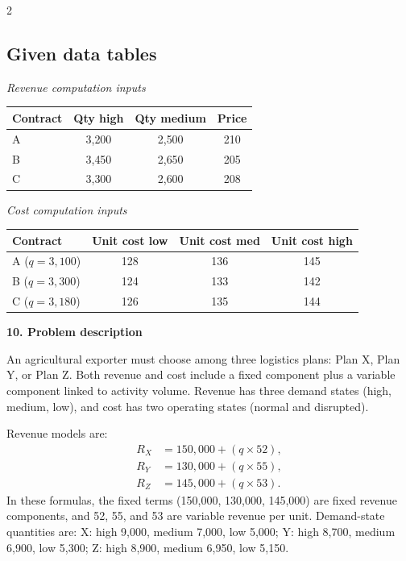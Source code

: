 \documentclass[12pt]{article}
\newcommand{\SubsectionBox}[1]{%
	\noindent\colorbox{gray!30}{%
		\parbox{\linewidth}{\textbf{#1}}%
	}\par\vspace{0.35cm}%
}
\begin{document}
\begin{multicols}{2}
				\subsection*{Given data tables}
				\begin{center}
					\begin{minipage}[t]{0.48\linewidth}
						\textit{Revenue computation inputs}
						\begin{center}
							\begin{tabular}{l c c c}
								\toprule
								Contract & Qty high & Qty medium & Price \\
								\midrule
								A & 3{,}200 & 2{,}500 & 210 \\
								B & 3{,}450 & 2{,}650 & 205 \\
								C & 3{,}300 & 2{,}600 & 208 \\
								\bottomrule
							\end{tabular}
						\end{center}
					\end{minipage}
					\hfill
					\begin{minipage}[t]{0.48\linewidth}
						\textit{Cost computation inputs}
						\begin{center}
							\begin{tabular}{l c c c}
								\toprule
								Contract & Unit cost low & Unit cost med & Unit cost high \\
								\midrule
								A ($q=3{,}100$) & 128 & 136 & 145 \\
								B ($q=3{,}300$) & 124 & 133 & 142 \\
								C ($q=3{,}180$) & 126 & 135 & 144 \\
								\bottomrule
							\end{tabular}
						\end{center}
					\end{minipage}
				\end{center}

		\vspace{0.25cm}
		\SubsectionBox{10. Problem description}\vspace{-0.25cm}
		An agricultural exporter must choose among three logistics plans: Plan X, Plan Y, or Plan Z.
				Both revenue and cost include a fixed component plus a variable component linked to activity volume.
				Revenue has three demand states (high, medium, low), and cost has two operating states (normal and disrupted).
				
				Revenue models are:
				\[
				\begin{aligned}
				R_X &= 150{,}000 + (q\times52),\\
				R_Y &= 130{,}000 + (q\times55),\\
				R_Z &= 145{,}000 + (q\times53).
				\end{aligned}
				\]
				In these formulas, the fixed terms (150{,}000, 130{,}000, 145{,}000) are fixed revenue components, and 52, 55, and 53 are variable revenue per unit.
				Demand-state quantities are:
				X: high 9{,}000, medium 7{,}000, low 5{,}000;
				Y: high 8{,}700, medium 6{,}900, low 5{,}300;
				Z: high 8{,}900, medium 6{,}950, low 5{,}150.
				

\end{multicols}
\end{document}
